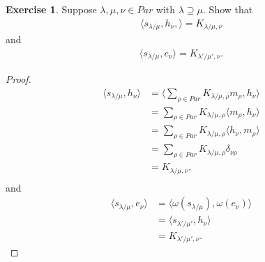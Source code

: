 \documentclass[12pt]{extarticle}
\newcommand{\<}{\langle}
\renewcommand{\>}{\rangle}
\theoremstyle{definition}
\newtheorem{exercise}{Exercise}
\begin{document}
\begin{exercise}
  Suppose $\lambda, \mu, \nu \in Par$ with $\lambda \supseteq \mu$. Show that
  \begin{align*}
    \< s_{\lambda / \mu}, h_{\nu}, \> = K_{\lambda/\mu, \nu}
  \end{align*}
  and
  \begin{align*}
    \< s_{\lambda / \mu}, e_{\nu} \> = K_{\lambda' / \mu', \nu}.
  \end{align*}
\end{exercise}
\begin{proof}
  \begin{align*}
    \< s_{\lambda / \mu}, h_{\nu} \>
    &= \< \sum\limits_{\rho \in Par} K_{\lambda/\mu, \rho} m_{\rho} , h_{\nu} \> \\
    &= \sum\limits_{\rho \in Par} K_{\lambda/\mu, \rho} \< m_{\rho} , h_{\nu} \> \\
    &= \sum\limits_{\rho \in Par} K_{\lambda/\mu, \rho} \< h_{\nu},  m_{\rho} \> \\
    &= \sum\limits_{\rho \in Par} K_{\lambda/\mu, \rho} \delta_{\nu \rho} \\
    &= K_{\lambda/\mu, \nu}, \\    
  \end{align*}
  and
  \begin{align*}
    \< s_{\lambda / \mu}, e_{\nu} \>
    &= \< \omega(s_{\lambda / \mu}), \omega(e_{\nu}) \> \\
    &= \< s_{\lambda' / \mu'}, h_{\nu} \> \\
    &= K_{\lambda' / \mu', \nu}.
  \end{align*}
\end{proof}
\end{document}
